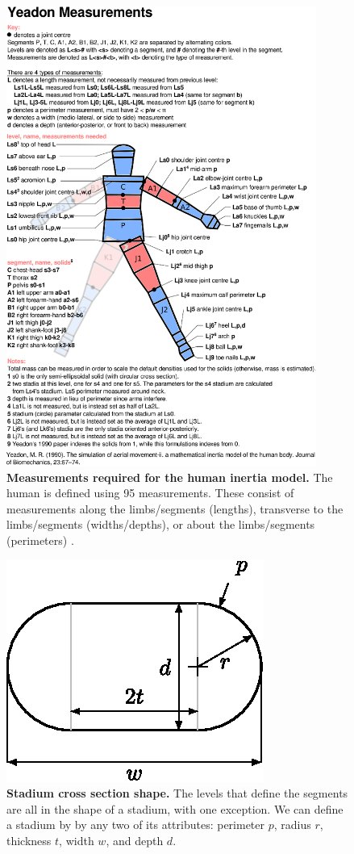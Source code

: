 \documentclass[10pt]{article}
\begin{document}
\begin{figure}[!ht]
\begin{center}
\includegraphics[width=4in]{measurements.eps}
\end{center}
\caption{
{\bf Measurements required for the human inertia model.}  The human is defined
using 95 measurements. These consist of measurements along the limbs/segments
(lengths), transverse to the limbs/segments (widths/depths), or about the
limbs/segments (perimeters) \cite{Yeadon1990c}.
}
\label{fig:meas}
\end{figure}

\begin{figure}[!ht]
\begin{center}
\includegraphics{stadium.eps}
\end{center}
\caption{
{\bf Stadium cross section shape.}  The levels that define the segments are all
in the shape of a stadium, with one exception. We can define a stadium by
by any two of its attributes: perimeter $p$, radius $r$, thickness $t$,  width
$w$, and depth $d$.
}
\label{fig:stadium}
\end{figure}
\end{document}
